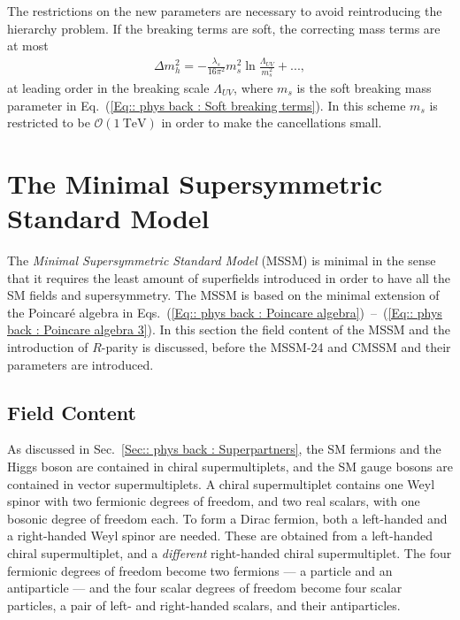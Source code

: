 \documentclass[twoside,english]{uiofysmaster}
\begin{document}
The restrictions on the new parameters are necessary to avoid reintroducing the hierarchy problem. If the breaking terms are soft, the correcting mass terms are at most
\begin{align*}
\Delta m_h^2 = - \frac{\lambda_s}{16 \pi^2} m_s^2\ln \frac{\Lambda_{UV}}{m_s^2} +...,
\end{align*}
at leading order in the breaking scale $\Lambda_{UV}$, where $m_s$ is the soft breaking mass parameter in Eq.~(\ref{Eq:: phys back : Soft breaking terms}). In this scheme $m_s$ is restricted to be $\mathcal{O}(1~\mathrm{TeV})$ in order to make the cancellations small.

\section[The Minimal Supersymmetric Standard Model]{The Minimal Supersymmetric\\ Standard Model}

The \textit{Minimal Supersymmetric Standard Model} (MSSM)  is minimal in the sense that it requires the least amount of superfields introduced in order to have all the SM fields and supersymmetry. The MSSM is based on the minimal extension of the Poincar\'{e} algebra in Eqs.~(\ref{Eq:: phys back : Poincare algebra})~--~(\ref{Eq:: phys back : Poincare algebra 3}). In this section the field content of the MSSM and the introduction of $R$-parity is discussed, before the MSSM-24 and CMSSM and their parameters are introduced.  


\subsection{Field Content}

As discussed in Sec.~\ref{Sec:: phys back : Superpartners}, the SM fermions and the Higgs boson are contained in chiral supermultiplets, and the SM gauge bosons are contained in vector supermultiplets. A chiral supermultiplet contains one Weyl spinor with two fermionic degrees of freedom, and two real scalars, with one bosonic degree of freedom each. To form a Dirac fermion, both a left-handed and a right-handed Weyl spinor are needed. These are obtained from a left-handed chiral supermultiplet, and a \textit{different} right-handed chiral supermultiplet. The four fermionic degrees of freedom become two fermions --- a particle and an antiparticle --- and the four scalar degrees of freedom become four scalar particles, a pair of left- and right-handed scalars, and their antiparticles.  
\end{document}
